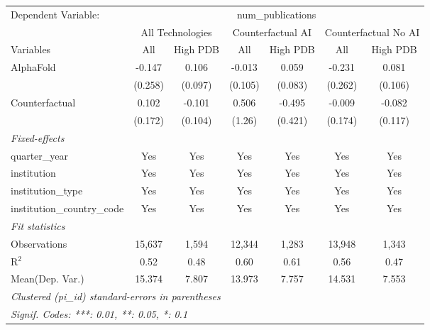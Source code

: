 \begingroup
\centering
\begin{tabular}{lcccccc}
   \tabularnewline \midrule \midrule
   Dependent Variable: & \multicolumn{6}{c}{num\_publications}\\
 & \multicolumn{2}{c}{All Technologies} & \multicolumn{2}{c}{Counterfactual AI} & \multicolumn{2}{c}{Counterfactual No AI} \\
\cmidrule(lr){1-1}\cmidrule(lr){2-3} \cmidrule(lr){4-5} \cmidrule(lr){6-7}
Variables & \multicolumn{1}{c}{All} & \multicolumn{1}{c}{High PDB} & \multicolumn{1}{c}{All} & \multicolumn{1}{c}{High PDB} & \multicolumn{1}{c}{All} & \multicolumn{1}{c}{High PDB} \\
\cmidrule(lr){1-1}\cmidrule(lr){2-2} \cmidrule(lr){3-3} \cmidrule(lr){4-4} \cmidrule(lr){5-5} \cmidrule(lr){6-6} \cmidrule(lr){7-7}
   AlphaFold                    & -0.147  & 0.106   & -0.013  & 0.059   & -0.231  & 0.081\\   
                                & (0.258) & (0.097) & (0.105) & (0.083) & (0.262) & (0.106)\\   
   Counterfactual               & 0.102   & -0.101  & 0.506   & -0.495  & -0.009  & -0.082\\   
                                & (0.172) & (0.104) & (1.26)  & (0.421) & (0.174) & (0.117)\\   
   \midrule
   \emph{Fixed-effects}\\
   quarter\_year                & Yes     & Yes     & Yes     & Yes     & Yes     & Yes\\  
   institution                  & Yes     & Yes     & Yes     & Yes     & Yes     & Yes\\  
   institution\_type            & Yes     & Yes     & Yes     & Yes     & Yes     & Yes\\  
   institution\_country\_code   & Yes     & Yes     & Yes     & Yes     & Yes     & Yes\\  
   \midrule
   \emph{Fit statistics}\\
   Observations                 & 15,637  & 1,594   & 12,344  & 1,283   & 13,948  & 1,343\\  
   R$^2$                        & 0.52    & 0.48    & 0.60    & 0.61    & 0.56    & 0.47\\  
Mean(Dep. Var.) & 15.374 & 7.807 & 13.973 & 7.757 & 14.531 & 7.553 \\
   \midrule \midrule
   \multicolumn{7}{l}{\emph{Clustered (pi\_id) standard-errors in parentheses}}\\
   \multicolumn{7}{l}{\emph{Signif. Codes: ***: 0.01, **: 0.05, *: 0.1}}\\
\end{tabular}
\par\endgroup
